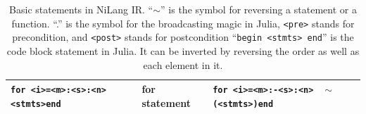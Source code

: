 \documentclass{article}
\newcommand{\<}{\langle}
\renewcommand{\>}{\rangle}
\newcommand{\cquad}{{{ }_{\quad}}}
\theoremstyle{definition}\newtheorem{definition}{\textit{Definition}}
\begin{document}
\begin{table}[h!]
\begin{minipage}{\columnwidth}
{\begin{tabularx}{\textwidth}{X X X}
            \hline
            \texttt{for <i>=<m>:<s>:<n>}\newline $\cquad$\texttt{<stmts>}\newline \texttt{end} & for statement & \texttt{for <i>=<m>:-<s>:<n>}\newline $\cquad$ \texttt{$\sim$(<stmts>)}\newline \texttt{end}\\
            \bottomrule
        \end{tabularx}
    }
    \caption{Basic statements in NiLang IR.
    ``$\sim$'' is the symbol for reversing a statement or a function.
    ``.'' is the symbol for the broadcasting magic in Julia,
    \texttt{<pre>} stands for precondition, and \texttt{<post>} stands for postcondition
``\texttt{begin <stmts> end}'' is the code block statement in Julia.
It can be inverted by reversing the order as well as each element in it.
}\label{tbl:revstatements}
\end{minipage}
\end{table}
\end{document}

